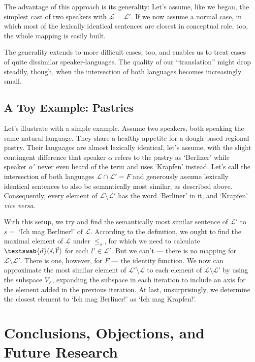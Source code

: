 \documentclass[11pt, a4paper]{scrartcl}
\renewcommand{\i}[1]{\emph{#1}}
\renewcommand{\L}{\mathcal{L}}
\renewcommand{\v}[1]{\vec{\mathrm{#1}}}
\newcommand{\m}[1]{\textswab{#1}}
\begin{document}
The advantage of this approach is its generality: Let's assume, like we began, the simplest cast of two speakers with $\L = \L'$. If we now assume a normal case, in which most of the lexically identical sentences are closest in conceptual role, too, the whole mapping is easily built. 

The generality extends to more difficult cases, too, and enables us to treat cases of quite dissimilar speaker-languages. The quality of our ``translation'' might drop steadily, though, when the intersection of both languages becomes increasingly small. 

\subsection{A Toy Example: Pastries}

Let's illustrate with a simple example. Assume two speakers, both speaking the same natural language. They share a healthy appetite for a dough-based regional pastry. Their languages are almost lexically identical, let's assume, with the slight contingent difference that speaker $\alpha$ refers to the pastry as `Berliner' while speaker $\alpha'$ never even heard of the term and uses `Krapfen' instead. Let's call the intersection of both languages $\L \cap \L' = F$ and generously assume lexically identical sentences to also be semantically most similar, as described above. Consequently, every element of $\L\setminus \L'$ has the word `Berliner' in it, and `Krapfen' \i{vice versa}.

With this setup, we try and find the semantically most similar sentence of $\L'$ to $s =$ `Ich mag Berliner!' of $\L$. According to the definition, we ought to find the maximal element of $\L$ under $\leqslant_s$, for which we need to calculate $\m{d}(\v{s},\v{l'})$ for each $l' \in \L'$. But we can't --- there is no mapping for $\L\setminus\L'$. There is one, however, for $F$ --- the identity function. We now can approximate the most similar element of $\L'\setminus\L$ to each element of $\L\setminus\L'$ by using the subspace $V_F$, expanding the subspace in each iteration to include an axis for the element added in the previous iteration. At last, unsurprisingly, we determine the closest element to `Ich mag Berliner!' as `Ich mag Krapfen!'. 

\section{Conclusions, Objections, and Future Research}
\end{document}
